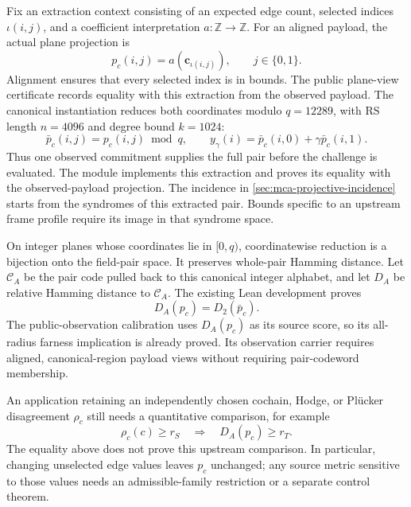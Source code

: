 Fix an extraction context consisting of an expected edge count, selected
indices \(\iota(i,j)\), and a coefficient interpretation
\(a:\mathbb Z\to\mathbb Z\). For an aligned payload, the actual plane
projection is
\[
  p_c(i,j)=a(\mathbf c_{\iota(i,j)}),
  \qquad j\in\{0,1\}.
\]
Alignment ensures that every selected index is in bounds. The public
plane-view certificate records equality with this extraction from the
observed payload. The canonical instantiation reduces both coordinates
modulo \(q=12289\), with RS length \(n=4096\) and degree bound \(k=1024\):
\[
  \bar p_c(i,j)=p_c(i,j)\bmod q,
  \qquad
  y_\gamma(i)=\bar p_c(i,0)+\gamma\bar p_c(i,1).
\]
Thus one observed commitment supplies the full pair before the challenge is
evaluated. The  module implements this extraction
and proves its equality with the observed-payload projection.
The incidence in \cref{sec:mca-projective-incidence} starts from the
syndromes of this extracted pair. Bounds specific to an upstream frame
profile require its image in that syndrome space.

On integer planes whose coordinates lie in \([0,q)\), coordinatewise
reduction is a bijection onto the field-pair space. It preserves whole-pair
Hamming distance. Let \(\mathcal C_A\) be the pair code pulled back to
this canonical integer alphabet, and let \(D_A\) be relative Hamming
distance to \(\mathcal C_A\). The existing Lean development proves
\[
  D_A(p_c)=D_2(\bar p_c).
\]
The public-observation calibration uses \(D_A(p_c)\) as its source score,
so its all-radius farness implication is already proved. Its observation
carrier requires aligned, canonical-region payload views without requiring
pair-codeword membership.

An application retaining an independently chosen cochain, Hodge, or
Pl\"ucker disagreement \(\rho_c\) still needs a quantitative comparison,
for example
\[
  \rho_c(c)\ge r_S
  \quad\Longrightarrow\quad
  D_A(p_c)\ge r_T.
\]
The equality above does not prove this upstream comparison. In particular,
changing unselected edge values leaves \(p_c\) unchanged; any source metric
sensitive to those values needs an admissible-family restriction or a
separate control theorem.


